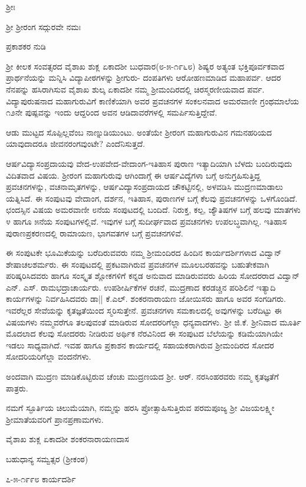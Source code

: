 \newpage

\begin{center}
ಶ್ರೀಃ

\smallskip
ಶ್ರೀ ಶ್ರೀರಂಗ ಸದ್ಗುರವೇ ನಮಃ

\medskip

{\Large ಪ್ರಕಾಶಕರ ನುಡಿ}
\end{center}

ಶ್ರೀ ಕೀಲಕ ಸಂವತ್ಸರದ ವೈಶಾಖ ಶುಕ್ಲ ಏಕಾದಶೀ ಬುಧವಾರ(೮-೫-೧೯೬೮) ಶಿಷ್ಯರ ಅತ್ಯಂತ ಭಕ್ತಿಪೂರ್ವಕವಾದ ಪ್ರಾರ್ಥನೆಯನ್ನು ಮನ್ನಿಸಿ ವಿದ್ಯಾಪೀಠಗಳನ್ನು  ಶ್ರೀಗುರು- ದಂಪತಿಗಳು ಆರೋಹಣಮಾಡಿದ ಮಹಾಪರ್ವ. ಆದರ ನೆನಪನ್ನು ಹಸಿರಾಗಿಸುವ ವೈಶಾಖ ಶುಲ್ಕ ಏಕಾದಶೀ ನಮ್ಮ ಶ್ರೀಮಂದಿರದಲ್ಲಿ ಚಿರಸ್ಮರಣೀಯವಾದ ಪರ್ವ. ವಿದ್ಯಾಪುರುಷನಾದ ಮಹಾಗುರುವಿಗೆ ಕಾಣಿಕೆಯಾಗಿ ಅವರ ಪ್ರವಚನಗಳ ಸಂಕಲನವಾದ ಅಮರವಾಣೀ ಗ್ರಂಥಮಾಲೆಯ ೧೨ನೇ ಪುಷ್ಪವನ್ನು ಇಂದು ಆದ್ದರಿಂದ ಅವನ ಆಡಿದಾವರೆಗಳಲ್ಲಿ ಸಮರ್ಪಿಸುತ್ತಿದ್ದೇವೆ.

ಆಡು ಮುಟ್ಟದ ಸೊಪ್ಪಿಲ್ಲವೆಂಬ ನಾಣ್ನುಡಿಯುಂಟು. ಅಂತೆಯೇ ಶ್ರೀರಂಗ ಮಹಾಗುರುವಿನ ಗಮನಹರಿಯದ ಯಾವುದಾದರೂ ಜೀವನರಂಗವುಂಟೇ? ಎಂದೆನಿಸುತ್ತದೆ.

ಆರ್ಷವಿದ್ಯಾಸಂಪ್ರದಾಯವು ವೇದ-ಉಪವೇದ-ವೇದಾಂಗ-ಇತಿಹಾಸ ಪುರಾಣ ಇತ್ಯಾದಿಯಾಗಿ ಬೆಳದು ಬಂದಿರುವುದು ವಿದಿತವಾದ ವಿಷಯ. ಶ್ರೀರಂಗ ಮಹಾಗುರುವು ಆಗಿಂದಾಗ್ಗೆ ಈ ಆರ್ಷವಿದ್ಯೆಗಳಾ ಬಗ್ಗೆ ಅನುಗ್ರಹಿಸುತ್ತಿದ್ದ ಪ್ರವಚನಗಳನ್ನು, ವಚನಾಮೃತಗಳನ್ನು, ಆರ್ಷವಿದ್ಯಾಸಂಪ್ರದಾಯದ ಚೌಕಟ್ಟಿನಲ್ಲಿ, ಅಳವಡಿಸಿ ಮುದ್ರಣಮಾಡಾಲು ಯತ್ನಿಸಿದೆ. ಈ ಸಂಪುಟವು ವೇದಾಂಗ, ದರ್ಶನ, ಇತಿಹಾಸ, ಪುರಾಣಗಳ ಬಗ್ಗೆ ಕೆಲವು ಪ್ರವಚನಗಳನ್ನು ಒಳಗೊಂಡಿದೆ. ಛಂದಸ್ಸಿನ ವಿಷಯ ಅಮರವಾಣೀ ೮ನೆಯ ಸಂಪುಟದಲ್ಲಿ ಬಂದಿದೆ. ನಿರುಕ್ತ, ಕಲ್ಪ, ಜ್ಯೌತಿಷಗಳ ಬಗ್ಗೆ ಹಲವು ಮಾತಗಳು ೪ ಹಾಗೂ ೫ನೆಯ ಸಂಪುಟಗಳಲ್ಲಿವೆ. ಇವುಗಳ ಬಗ್ಗೆ ಸುದೀರ್ಘವಾದ ಪ್ರವಚನಗಳು ಉಪಲಬ್ಧವಾಗಿಲ್ಲ. ಇತಿಹಾಸ ಪುರಾಣಪ್ರಕರಣದಲ್ಲಿ ರಾಮಾಯಣ, ಭಾಗವತಗಳ ಬಗ್ಗೆ ಪ್ರವಚನಗಳಿವೆ.

ಈ ಸಂಪುಟಕೇ ಭೂಮಿಕೆಯನ್ನು ಬರೆದಿರುವವರು ನಮ್ಮ ಶ್ರೀಮಂದಿರದ ಹಿಂದಿನ ಕಾರ್ಯದರ್ಶಿಗಳಾದ ವಿದ್ವಾನ್ ಶೇಷಾಚಲಶರ್ಮರು. ಈ ಸಂಪುಟದಲ್ಲಿ ಪ್ರಕಟವಾಗಿರುವ ಪ್ರವಚನಗಳ ಮೂಲಬರಹವನ್ನು ಬಹುತೇಕವಾಗಿ ಪರಿಷ್ಕರಿಸಿದವರು ಹಾಗೂ ಸಂಸ್ಕೃತ ಶ್ಲೋಕಗಳಿಗೆ ಕನ್ನಡ ಅನುವಾದ ಮಾಡಿರುವವರು ಹಿರಿಯ ಸೋದರರಾದ ವಿದ್ವಾನ್ ಎನ್. ಎಸ್. ರಾಮಭದ್ರಾಚಾರ್ಯರು. ಉಪಶೀರ್ಷಿಕೆಗಳ ರಚನೆ, ಮುದ್ರಣಾದ ಕರಡಚ್ಚಿನ ಪರಿಶಿಲಿನೆ ಇತ್ಯಾದಿ ಕಾರ್ಯಗಳನ್ನು ನಿರ್ವಹಿಸಿದವರು ಡಾ|| ಕೆ.ಎಲ್. ಶಂಕರನಾರಾಯಣ ಜೋಯಿಸರು ಹಾಗೂ ಅವರ ಸಂಗಡಿಗರು. ಇವರೆಲ್ಲರ ಸೇವೆಯನ್ನು ಕೃತಜ್ಞತೆಯಿಂದ ಸ್ಮರಿಸುತ್ತೇನೆ.
ಪ್ರವಚನಗಳಾ ಸಮಕಾಲದಲ್ಲಿ ಅವುಗಳನ್ನು ಬರೆದಿಟ್ಟು ಈ ವಿಷಯಗಳು ನಮ್ಮವರೆಗೂ ತಲಪುವಂತೆ ಮಾಡಿರುವ ಸೋದರರಿಗೆಲ್ಲಾ ಧನ್ಯವಾದಗಳು. ಶ್ರೀ ಜಿ.ಕೆ. ಶ್ರೀನಿವಾದ ಮೂರ್ತಿ ಮೊದಲಾದ ಕೆಲವು ಸೋದರರು ನೀಡಿರುವ ಅರ್ಥಿಕ ನೆರವಿನಿಂದ ಈ ಸಂಪುಟದ ಬೆಲೆಯನ್ನು ಕಡಿಮೆಯಾಗಿಯೇ ಇಡಲು ಸಾಧ್ಯವಾಗಿದೆ. ಇವಹ ಹಾಗೂ ಪ್ರಕಾಶನ ಕಾರ್ಯದಲ್ಲಿ ಸಹಾಯಕರಾಗಿರುವ ಶ್ರೀಮಂದಿರದ ಸೋದರ ಸೋದರಿಯರಿಗೆಲ್ಲಾ ವಂದನೆಗಳು.

ಅಂದವಾಗಿ ಮುದ್ರಣ ಮಾಡಿಕೊಟ್ಟಿರುವ ಚೆಂಚು ಮುದ್ರಣಯದ ಶ್ರೀ. ಆರ್. ನರಸಿಂಹರವರು ನಮ್ಮ ಕೃತಜ್ಞತೆಗೆ ಪಾತ್ರರು.

ನಮಗೆ ಸ್ಫೂರ್ತಿಯ ಚಿಲುಮೆಯಾಗಿ, ನಮ್ಮನ್ನು ಹರಸಿ ಪ್ರೋತ್ಸಾಹಿಸುತ್ತಿರುವ ಪರಮಪೂಜ್ಯ ಶ್ರೀ ವಿಜಯಲಕ್ಷ್ಮೀ ಶ್ರೀಮಾತೆಯವರಿಗೆ ಪ್ರಾನಪ್ರಣಾಮಗಳು.

\medskip
ವೈಶಾಖ ಶುಕ್ಲ ಏಕಾದಶೀ \hfill  ಶಂಕರನಾರಾಯಣದಾಸ

\medskip
ಬಹುಧಾನ್ಯ ಸಮ್ವತ್ಸರ \hfill (ಶ್ರೀಕಂಠ)

\medskip
೭-೫-೧೯೯೮  \hfill ಕಾರ್ಯದರ್ಶಿ
